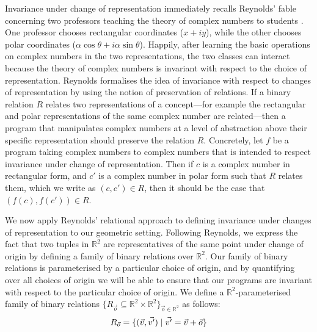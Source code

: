 Invariance under change of representation immediately recalls
Reynolds' fable concerning two professors teaching the theory of
complex numbers to students \cite{reynolds83types}. One professor
chooses rectangular coordinates ($x + iy$), while the other chooses
polar coordinates ($\alpha\cos\theta + i\alpha\sin\theta$). Happily,
after learning the basic operations on complex numbers in the two
representations, the two classes can interact because the theory of
complex numbers is invariant with respect to the choice of
representation. Reynolds formalises the idea of invariance with
respect to changes of representation by using the notion of
preservation of relations. If a binary relation $R$ relates two
representations of a concept---for example the rectangular and polar
representations of the same complex number are related---then a
program that manipulates complex numbers at a level of abstraction
above their specific representation should preserve the relation
$R$. Concretely, let $f$ be a program taking complex numbers to
complex numbers that is intended to respect invariance under change of
representation. Then if $c$ is a complex number in rectangular form,
and $c'$ is a complex number in polar form such that $R$ relates them,
which we write as $(c,c') \in R$, then it should be the case that
$(f(c), f(c')) \in R$.

We now apply Reynolds' relational approach to defining invariance
under changes of representation to our geometric setting. Following
Reynolds, we express the fact that two tuples in $\mathbb{R}^2$ are
representatives of the same point under change of origin by defining a
family of binary relations over $\mathbb{R}^2$. Our family of binary
relations is parameterised by a particular choice of origin, and by
quantifying over all choices of origin we will be able to ensure that
our programs are invariant with respect to the particular choice of
origin. We define a $\mathbb{R}^2$-parameterised family of binary
relations $\{ R_{\vec{o}} \subseteq \mathbb{R}^2 \times \mathbb{R}^2
\}_{\vec{o} \in \mathbb{R}^2}$ as follows:
\begin{displaymath}
  R_{\vec{o}} = \{ (\vec{v}, \vec{v'}) \mathrel| \vec{v'} = \vec{v} + \vec{o} \}
\end{displaymath}

